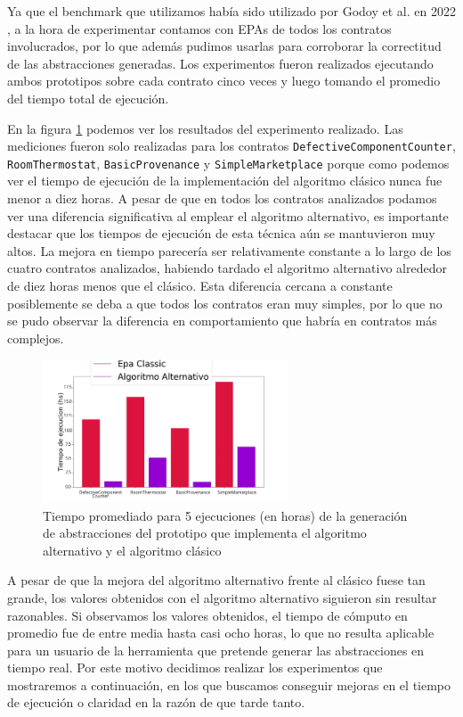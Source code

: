 Ya que el benchmark que utilizamos había sido utilizado por Godoy et al. en 2022 \cite{predicate-abstraction-for-smart-contract-validation}, a la hora de experimentar contamos con EPAs de todos los contratos involucrados, por lo que además pudimos usarlas para corroborar la correctitud de las abstracciones generadas.
Los experimentos fueron realizados ejecutando ambos prototipos sobre cada contrato cinco veces y luego tomando el promedio del tiempo total de ejecución.

En la figura \ref{fig:classic-vs-alternativo} podemos ver los resultados del experimento realizado.
Las mediciones fueron solo realizadas para los contratos \texttt{DefectiveComponentCounter}, \texttt{RoomThermostat}, \texttt{BasicProvenance} y \texttt{SimpleMarketplace} porque como podemos ver el tiempo de ejecución de la implementación del algoritmo clásico nunca fue menor a diez horas.
A pesar de que en todos los contratos analizados podamos ver una diferencia significativa al emplear el algoritmo alternativo, es importante destacar que los tiempos de ejecución de esta técnica aún se mantuvieron muy altos.
La mejora en tiempo parecería ser relativamente constante a lo largo de los cuatro contratos analizados, habiendo tardado el algoritmo alternativo alrededor de diez horas menos que el clásico.
Esta diferencia cercana a constante posiblemente se deba a que todos los contratos eran muy simples, por lo que no se pudo observar la diferencia en comportamiento que habría en contratos más complejos.

\begin{figure}[h]
    \centering
    \includegraphics[width=0.65\textwidth]{figs/classic_vs_alternativo.png}
    \caption{Tiempo promediado para 5 ejecuciones (en horas) de la generación de abstracciones del prototipo que implementa el algoritmo alternativo y el algoritmo clásico}
    \label{fig:classic-vs-alternativo}
\end{figure}

A pesar de que la mejora del algoritmo alternativo frente al clásico fuese tan grande, los valores obtenidos con el algoritmo alternativo siguieron sin resultar razonables.
Si observamos los valores obtenidos, el tiempo de cómputo en promedio fue de entre media hasta casi ocho horas, lo que no resulta aplicable para un usuario de la herramienta que pretende generar las abstracciones en tiempo real.
Por este motivo decidimos realizar los experimentos que mostraremos a continuación, en los que buscamos conseguir mejoras en el tiempo de ejecución o claridad en la razón de que tarde tanto.


